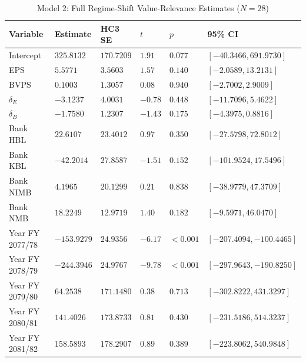 \begin{table}[!htbp]
\centering
\small
\setlength{\tabcolsep}{4pt}
\caption{Model 2: Full Regime-Shift Value-Relevance Estimates ($N = 28$)}
\label{tab:app_m2full}
\begin{tabular}{>{\raggedright\arraybackslash}p{}>{\raggedright\arraybackslash}p{}>{\raggedright\arraybackslash}p{}>{\raggedright\arraybackslash}p{}>{\raggedright\arraybackslash}p{}>{\raggedright\arraybackslash}p{}}
\toprule
\textbf{Variable} & \textbf{Estimate} & \textbf{HC3 SE} & \textbf{$t$} & \textbf{$p$} & \textbf{95\% CI} \\
\midrule
Intercept & $325.8132$ & $170.7209$ & $1.91$ & $0.077$ & $[-40.3466, 691.9730]$ \\
\addlinespace
EPS & $5.5771$ & $3.5603$ & $1.57$ & $0.140$ & $[-2.0589, 13.2131]$ \\
\addlinespace
BVPS & $0.1003$ & $1.3057$ & $0.08$ & $0.940$ & $[-2.7002, 2.9009]$ \\
\addlinespace
$\delta_E$ & $-3.1237$ & $4.0031$ & $-0.78$ & $0.448$ & $[-11.7096, 5.4622]$ \\
\addlinespace
$\delta_B$ & $-1.7580$ & $1.2307$ & $-1.43$ & $0.175$ & $[-4.3975, 0.8816]$ \\
\addlinespace
Bank HBL & $22.6107$ & $23.4012$ & $0.97$ & $0.350$ & $[-27.5798, 72.8012]$ \\
\addlinespace
Bank KBL & $-42.2014$ & $27.8587$ & $-1.51$ & $0.152$ & $[-101.9524, 17.5496]$ \\
\addlinespace
Bank NIMB & $4.1965$ & $20.1299$ & $0.21$ & $0.838$ & $[-38.9779, 47.3709]$ \\
\addlinespace
Bank NMB & $18.2249$ & $12.9719$ & $1.40$ & $0.182$ & $[-9.5971, 46.0470]$ \\
\addlinespace
Year FY 2077/78 & $-153.9279$ & $24.9356$ & $-6.17$ & $<0.001$ & $[-207.4094, -100.4465]$ \\
\addlinespace
Year FY 2078/79 & $-244.3946$ & $24.9767$ & $-9.78$ & $<0.001$ & $[-297.9643, -190.8250]$ \\
\addlinespace
Year FY 2079/80 & $64.2538$ & $171.1480$ & $0.38$ & $0.713$ & $[-302.8222, 431.3297]$ \\
\addlinespace
Year FY 2080/81 & $141.4026$ & $173.8733$ & $0.81$ & $0.430$ & $[-231.5186, 514.3237]$ \\
\addlinespace
Year FY 2081/82 & $158.5893$ & $178.2907$ & $0.89$ & $0.389$ & $[-223.8062, 540.9848]$ \\
\bottomrule
\end{tabular}


\end{table}
